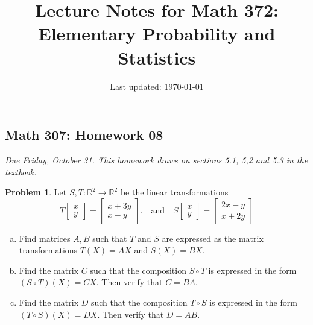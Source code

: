 \documentclass[10pt]{article}
\title{Lecture Notes for Math 372: \\Elementary Probability and Statistics}
\date{Last updated: \today}
\theoremstyle{definition}
\newtheorem{problem}[theorem]{Problem}
\newcommand{\1}[1]{\textbf{1}_{\left[#1\right]}} %
\def\R{\mathbb{R}} %
\begin{document}
\begin{center}
  \section*{Math 307: Homework 08}
  \textit{Due Friday, October 31. This homework draws on sections
    5.1, 5,2 and 5.3 in the textbook.}
\end{center}



\begin{problem}
  Let $S,T:\R^{2} \to \R^{2}$ be the linear transformations
  \begin{equation*}
    T
    \begin{bmatrix}
      x\\y
    \end{bmatrix}
    =
    \begin{bmatrix}
      x+3y\\x-y
    \end{bmatrix}.
    \quad \text{and} \quad 
    S
    \begin{bmatrix}
      x\\y
    \end{bmatrix}
    =
    \begin{bmatrix}
      2x-y\\x+2y
    \end{bmatrix}
  \end{equation*}
  \begin{enumerate}[(a)]
    \setlength{\itemsep}{0pt}
    \item Find matrices $A,B$ such that $T$ and $S$ are expressed as the
    matrix transformations $T(X)=AX$ and $S(X) = BX$.
    \item Find the matrix $C$ such that the composition $S\circ T$ is
    expressed in the form $(S\circ T)(X)=CX$. Then verify that $C=BA$.
    \item Find the matrix $D$ such that the composition $T\circ S$ is
    expressed in the form $(T\circ S)(X)=DX$. Then verify that $D=AB$.
  \end{enumerate}
\end{problem}
\end{document}

